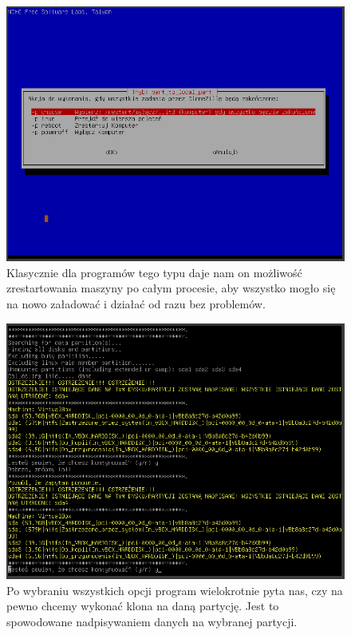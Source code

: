 \documentclass[0.82pt,a4paper]{article}
\begin{document}
    \begin{figure}[H]
        \centering
        \includegraphics[width=0.8\linewidth]{media/Clonezilla/clone9.PNG}
        \caption[clone wylaczenie]{Klasycznie dla programów tego typu daje nam on możliwość zrestartowania maszyny po całym procesie, aby wszystko mogło się na nowo załadować i działać od razu bez problemów.}
        \label{fig:clone9}
    \end{figure}
    
    \begin{figure}[H]
        \centering
        \includegraphics[width=0.8\linewidth]{media/Clonezilla/clone10.PNG}
        \caption[clone zapytania]{Po wybraniu wszystkich opcji program wielokrotnie pyta nas, czy na pewno chcemy wykonać klona na daną partycję. Jest to spowodowane nadpisywaniem danych na wybranej partycji.}
        \label{fig:clone10}
    \end{figure}
    
\end{document}
